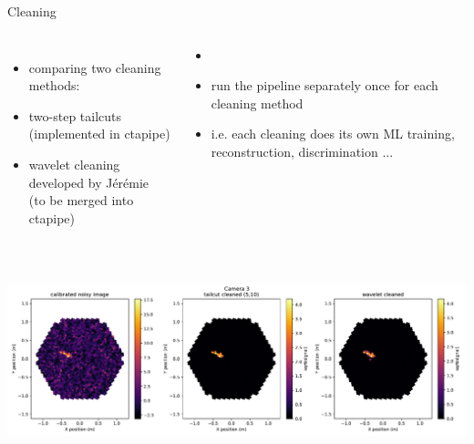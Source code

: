 \documentclass[8pt]{beamer}
\begin{document}
    \begin{frame}{Cleaning}
        \ \\
        \vfill
        \begin{columns}
                \begin{itemize}
                    \item[] comparing two cleaning methods:
                    \item two-step tailcuts (implemented in ctapipe)
                    \item wavelet cleaning developed by Jérémie\\
                        (to be merged into ctapipe)\\\ %
                \end{itemize}
                \begin{itemize}
                    \item[]
                    \item run the pipeline separately once for each cleaning method
                    \item i.e. each cleaning does its own ML training, reconstruction,
                        discrimination ...
                \end{itemize}
        \end{columns}
        \vfill
        \includegraphics[width=\textwidth]{pics/camera_display_cleaning}
    \end{frame}
\end{document}
